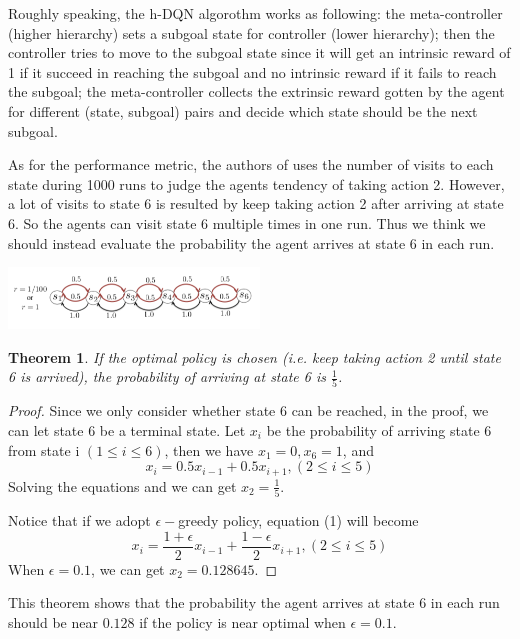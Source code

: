 \documentclass{article}
\newtheorem{theorem}{Theorem}
\begin{document}
\begin{spacing}{1.1}
    Roughly speaking, the h-DQN algorothm works as following: the meta-controller (higher hierarchy) sets a subgoal state for controller (lower hierarchy); then the controller tries to move to the subgoal state since it will get an intrinsic reward of 1 if it succeed in reaching the subgoal and no intrinsic reward if it fails to reach the subgoal; the meta-controller collects the extrinsic reward gotten by the agent for different (state, subgoal) pairs and decide which state should be the next subgoal.

    As for the performance metric, the authors of \cite{AI-16} uses the number of visits to each state during 1000 runs to judge the agents tendency of taking action 2. However, a lot of visits to state 6 is resulted by keep taking action 2 after arriving at state 6. So the agents can visit state 6 multiple times in one run. Thus we think we should instead evaluate the probability the agent arrives at state 6 in each run.
    \begin{center}
        \includegraphics[width = 0.5\textwidth]{game.png}
    \end{center}
    \begin{theorem}
    If the optimal policy is chosen (i.e. keep taking action 2 until state 6 is arrived), the probability of arriving at state 6 is $\frac{1}{5}$.
    \end{theorem}
    \begin{proof}
        Since we only consider whether state 6 can be reached, in the proof, we can let state 6 be a terminal state. Let $x_i$ be the probability of arriving state 6 from state i $(1\leq i \leq 6)$, then we have $x_1 = 0, x_6 = 1$, and
        \begin{equation}
            x_i = 0.5x_{i-1} + 0.5x_{i+1}, (2\leq i \leq 5)
        \end{equation}
        Solving the equations and we can get $x_2 = \frac{1}{5}$.

        Notice that if we adopt $\epsilon -$greedy policy, equation (1) will become
        \begin{equation}
            x_i = \frac{1 + \epsilon}{2}x_{i-1} + \frac{1 - \epsilon}{2}x_{i+1}, (2\leq i \leq 5)
        \end{equation}
        When $\epsilon = 0.1$, we can get $x_2 = 0.128645$.
    \end{proof}
    This theorem shows that the probability the agent arrives at state 6 in each run should be near $0.128$ if the policy is near optimal when $\epsilon = 0.1$.


\end{spacing}
\end{document}
